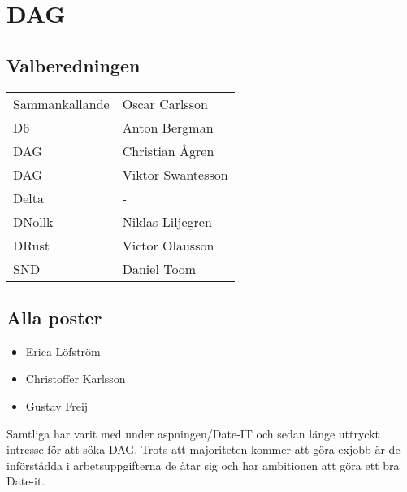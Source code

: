 \section{DAG}


\subsection{Valberedningen}
\begin{autoframe}

\begin{tabular}{ll}
Sammankallande & Oscar Carlsson \\
D6 & Anton Bergman \\
DAG  & Christian Ågren \\
DAG  & Viktor Swantesson \\
Delta  & - \\
DNollk & Niklas Liljegren \\
DRust & Victor Olausson \\
SND  & Daniel Toom
\end{tabular}
\end{autoframe}

\subsection{Alla poster}

\begin{autoframe}
\begin{itemize}
\item Erica Löfström
\item Christoffer Karlsson
\item Gustav Freij
\end{itemize}


\bigskip
Samtliga har varit med under aspningen/Date-IT och sedan länge uttryckt intresse för att söka DAG. Trots att majoriteten kommer att göra exjobb är de införstådda i arbetsuppgifterna de åtar sig och har ambitionen att göra ett bra Date-it.
\end{autoframe}
